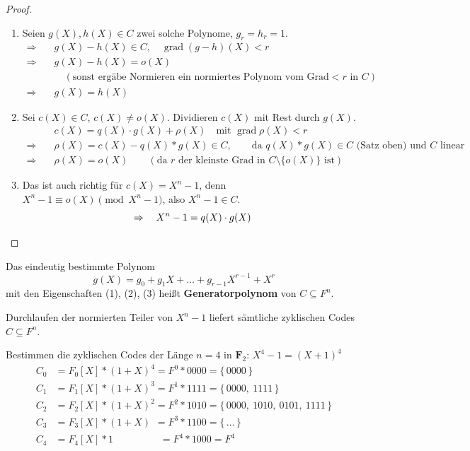\begin{proof}\leavevmode
\begin{enumerate}[label=(\arabic*)]
\item Seien $g(X), h(X) \in C$ zwei solche Polynome, $g_r = h_r = 1$.
\begin{align*}
\Rightarrow\quad & g(X) - h(X) \in C, \quad \operatorname{grad}(g - h)(X) < r \\
\Rightarrow\quad & g(X) - h(X) = o(X) \\ & \quad (\text{sonst ergäbe Normieren ein normiertes Polynom vom Grad} < r \text{ in } C) \\
\Rightarrow\quad & g(X) = h(X)
\end{align*}
\item Sei $c(X) \in C$, $c(X) \neq o(X)$. Dividieren $c(X)$ mit Rest durch $g(X)$.
\begin{align*}
& c(X) = q(X)\cdot g(X) + \rho(X) \quad \text{mit } \operatorname{grad} \rho(X) < r \\
\Rightarrow\quad & \rho(X) = c(X) - q(X) * g(X) \in C, \qquad \text{da } q(X) * g(X) \in C \text{ (Satz oben) und } C \text{ linear} \\
\Rightarrow\quad & \rho(X) = o(X) \qquad (\text{da } r \text{ der kleinste Grad in } C \setminus \{o(X)\} \text{ ist})
\end{align*}
\item Das ist auch richtig für $c(X) = X^n - 1$, denn $X^n - 1 \equiv o(X) \pmod{X^n - 1}$, also $X^n - 1 \in C$.
\[
\Rightarrow\quad X^n - 1 = q(X)\cdot g(X) \qedhere
\]
\end{enumerate}
\end{proof}

\begin{definition}
Das eindeutig bestimmte Polynom
\[
g(X) = g_0 + g_1 X + \dots + g_{r-1} X^{r-1} + X^r
\]
mit den Eigenschaften (1), (2), (3) heißt \textbf{Generatorpolynom} von $C \subseteq F^n$.
\end{definition}

Durchlaufen der normierten Teiler von $X^n - 1$ liefert sämtliche zyklischen Codes $C \subseteq F^n$.

\begin{beispiel}
Bestimmen die zyklischen Codes der Länge $n = 4$ in $\mathbf{F}_2$: \quad $X^4 - 1 = (X + 1)^4$
\begin{align*}
C_0 &= F_0[X] * (1 + X)^4 = F^0 * 0000 = \{\, 0000 \,\} \\
C_1 &= F_1[X] * (1 + X)^3 = F^1 * 1111 = \{\, 0000,\ 1111 \,\} \\
C_2 &= F_2[X] * (1 + X)^2 = F^2 * 1010 = \{\, 0000,\ 1010,\ 0101,\ 1111 \,\} \\
C_3 &= F_3[X] * (1 + X) \phantom{{}^2} = F^3 * 1100 = \{\, \dots \,\} \\
C_4 &= F_4[X] * 1 \phantom{(1 + X)^2} = F^4 * 1000 = F^4
\end{align*}
\end{beispiel}

